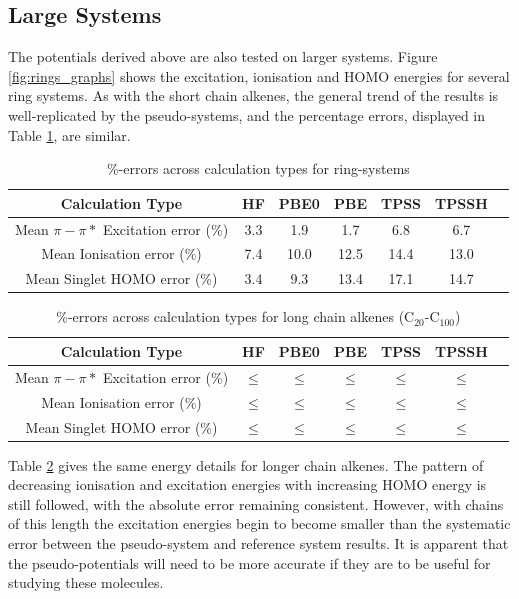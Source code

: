\documentclass[journal=jctcce,manuscript=article]{achemso}
\begin{document}
\subsection{Large Systems}

The potentials derived above are also tested on larger systems. Figure \ref{fig:rings_graphs} shows the excitation, ionisation and HOMO energies for several ring systems. As with the short chain alkenes, the general trend of the results is well-replicated by the pseudo-systems, and the percentage errors, displayed in Table \ref{table:ring_system_errors}, are similar.

\begin{table}[h]
\caption{\%-errors across calculation types for ring-systems}
\begin{tabular}{c c c c c c c}
\hline
Calculation Type & HF & PBE0 & PBE & TPSS & TPSSH \\
\hline\hline
Mean \(\pi - \pi*\) Excitation error (\%) & 3.3 & 1.9 & 1.7 & 6.8 & 6.7 \\
Mean Ionisation error (\%) & 7.4 & 10.0 & 12.5 & 14.4 & 13.0 \\
Mean Singlet HOMO error (\%) & 3.4  & 9.3  & 13.4 & 17.1 & 14.7 \\
\hline
\end{tabular}
\label{table:ring_system_errors}
\end{table}

\begin{table}[h]
\caption{\%-errors across calculation types for long chain alkenes (C\(_{20}\)-C\(_{100}\))}
\begin{tabular}{c c c c c c c}
\hline\hline
Calculation Type & HF & PBE0 & PBE & TPSS & TPSSH \\
\hline
Mean \(\pi - \pi*\) Excitation error (\%) & \(\leq\)  &\(\leq\) & \(\leq\)  & \(\leq\)  & \(\leq\)  \\
Mean Ionisation error (\%) & \(\leq\)  & \(\leq\)  & \(\leq\)  & \(\leq\)  & \(\leq\)  \\
Mean Singlet HOMO error (\%) & \(\leq\)  & \(\leq\)  & \(\leq\)  & \(\leq\)  & \(\leq\) \\
\hline
\end{tabular}
\label{table:long_alkene_errors}
\end{table}

Table \ref{table:long_alkene_errors} gives the same energy details for longer chain alkenes. The pattern of decreasing ionisation and excitation energies with increasing HOMO energy is still followed, with the absolute error remaining consistent. However, with chains of this length the excitation energies begin to become smaller than the systematic error between the pseudo-system and reference system results. It is apparent that the pseudo-potentials will need to be more accurate if they are to be useful for studying these molecules.
\end{document}
